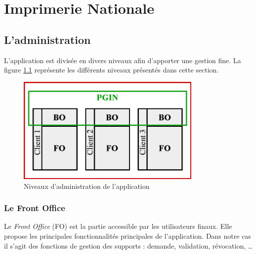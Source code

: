 \cleardoublepage

\chapter{Imprimerie Nationale}


\section{L'administration}

L'application est divisée en divers niveaux afin d'apporter une gestion fine.
La figure \ref{niveaux_administration} représente les différents niveaux présentés dans cette section.
\begin{figure}[!h]
	\center
	\includegraphics[width=0.8\textwidth]{img/niveaux_administration.png}
	\caption{Niveaux d'administration de l'application}
	\label{niveaux_administration}
\end{figure}


\subsection{Le Front Office}

Le \textit{Front Office} (FO) est la partie accessible par les utilisateurs finaux.
Elle propose les principales fonctionnalités principales de l'application.
Dans notre cas il s'agit des fonctions de gestion des supports : demande, validation, révocation, \ldots


